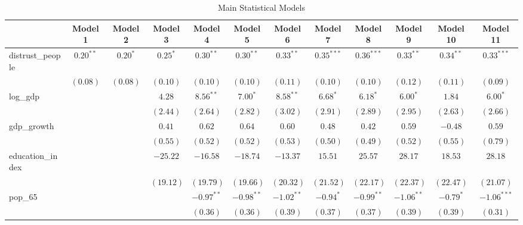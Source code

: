 \documentclass[
]{article}
\begin{document}
\begin{sidewaystable}
\caption{Main Statistical Models}
\begin{center}
\begin{tabular}{l c c c c c c c c c c c}
\hline
 & Model 1 & Model 2 & Model 3 & Model 4 & Model 5 & Model 6 & Model 7 & Model 8 & Model 9 & Model 10 & Model 11 \\
\hline
distrust\_people          & $0.20^{**}$ & $0.20^{*}$ & $0.25^{*}$ & $0.30^{**}$  & $0.30^{**}$  & $0.33^{**}$  & $0.35^{***}$ & $0.36^{***}$ & $0.33^{**}$  & $0.34^{**}$ & $0.33^{***}$  \\
                          & $(0.08)$    & $(0.08)$   & $(0.10)$   & $(0.10)$     & $(0.10)$     & $(0.11)$     & $(0.10)$     & $(0.10)$     & $(0.12)$     & $(0.11)$    & $(0.09)$      \\
log\_gdp                  &             &            & $4.28$     & $8.56^{**}$  & $7.00^{*}$   & $8.58^{**}$  & $6.68^{*}$   & $6.18^{*}$   & $6.00^{*}$   & $1.84$      & $6.00^{*}$    \\
                          &             &            & $(2.44)$   & $(2.64)$     & $(2.82)$     & $(3.02)$     & $(2.91)$     & $(2.89)$     & $(2.95)$     & $(2.63)$    & $(2.66)$      \\
gdp\_growth               &             &            & $0.41$     & $0.62$       & $0.64$       & $0.60$       & $0.48$       & $0.42$       & $0.59$       & $-0.48$     & $0.59$        \\
                          &             &            & $(0.55)$   & $(0.52)$     & $(0.52)$     & $(0.53)$     & $(0.50)$     & $(0.49)$     & $(0.52)$     & $(0.55)$    & $(0.79)$      \\
education\_index          &             &            & $-25.22$   & $-16.58$     & $-18.74$     & $-13.37$     & $15.51$      & $25.57$      & $28.17$      & $18.53$     & $28.18$       \\
                          &             &            & $(19.12)$  & $(19.79)$    & $(19.66)$    & $(20.32)$    & $(21.52)$    & $(22.17)$    & $(22.37)$    & $(22.47)$   & $(21.07)$     \\
pop\_65                   &             &            &            & $-0.97^{**}$ & $-0.98^{**}$ & $-1.02^{**}$ & $-0.94^{*}$  & $-0.99^{**}$ & $-1.06^{**}$ & $-0.79^{*}$ & $-1.06^{***}$ \\
                          &             &            &            & $(0.36)$     & $(0.36)$     & $(0.39)$     & $(0.37)$     & $(0.37)$     & $(0.39)$     & $(0.39)$    & $(0.31)$      \\

\end{tabular}
\end{center}
\end{sidewaystable}
\end{document}
